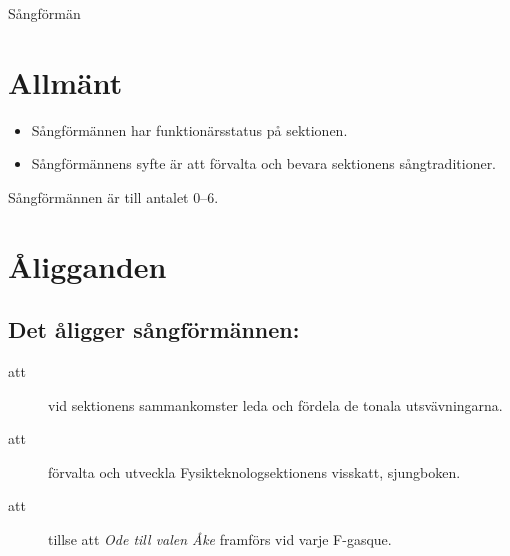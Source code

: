 \documentclass[a4paper]{article}
\begin{document}
\renewcommand{\forening}{Sångförmän} %

\begin{foreningenv}{\forening{}} %
    \section{Allmänt}
    \begin{itemize}
        \item Sångförmännen har funktionärsstatus på sektionen.
        \item Sångförmännens syfte är att förvalta och bevara sektionens sångtraditioner.
    \end{itemize}
    Sångförmännen är till antalet 0--6.
    
    \section{Åligganden}
    \aliggsektfunkt{}
    
    \subsection{Det åligger sångförmännen:}
    \begin{description}
        \item[att] vid sektionens sammankomster leda och fördela de tonala utsvävningarna.
        \item[att] förvalta och utveckla Fysikteknologsektionens visskatt, sjungboken.
        \item[att] tillse att \textit{Ode till valen Åke} framförs vid varje F-gasque.
    \end{description}
\end{foreningenv}
\end{document}
